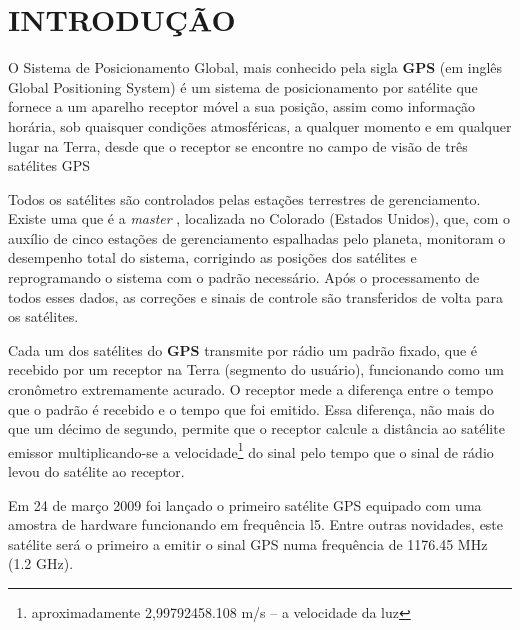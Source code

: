 
\chapter{INTRODUÇÃO}

O Sistema de Posicionamento Global, 
mais conhecido pela sigla \textbf{\huge {GPS}} %
(em inglês \foreignlanguage{english}{Global Positioning System}) %
é um sistema de posicionamento por satélite que fornece a um aparelho receptor móvel a sua posição, assim como informação horária,
sob quaisquer condições atmosféricas, a qualquer momento e em qualquer lugar na Terra, desde que
o receptor se encontre no campo de visão de três satélites GPS

Todos os satélites são controlados pelas estações terrestres de
gerenciamento. Existe uma que é a \textit{master}%
, localizada no Colorado (Estados Unidos), que, com o auxílio de cinco estações de gerenciamento
espalhadas pelo planeta, monitoram o desempenho total do sistema, corrigindo
as posições dos satélites e reprogramando o sistema com o padrão
necessário\cite{Barbosa2004}. Após o processamento de todos esses dados, as correções e
sinais de controle são transferidos de volta para os satélites.

Cada um dos satélites do \textbf{GPS} %
transmite por rádio um padrão fixado,
que é recebido por um receptor na Terra (segmento do usuário), funcionando
como um cronômetro extremamente acurado. O receptor mede a diferença
entre o tempo que o padrão é recebido e o tempo que foi emitido. Essa
diferença, não mais do que um décimo de segundo, permite que o receptor
calcule a distância ao satélite emissor multiplicando-se a 
velocidade\footnote{aproximadamente 2,99792458.108 m/s – a velocidade da luz} do sinal %
pelo tempo que o sinal de rádio levou do satélite ao receptor.

\newpage
Em 24 de março 2009 foi lançado o primeiro satélite GPS equipado com uma amostra de hardware funcionando em frequência l5.
Entre outras novidades, este satélite será o primeiro a emitir o sinal GPS numa frequência de 1176.45 MHz (1.2 GHz).\newline %

